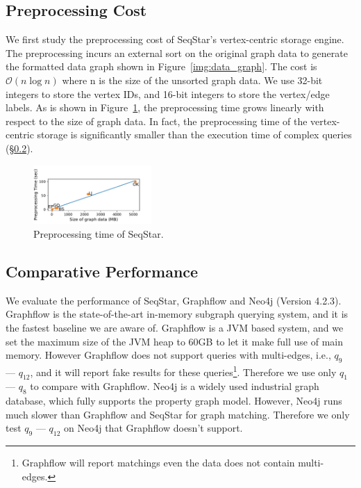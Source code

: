 \subsection{Preprocessing Cost}
We first study the preprocessing cost of SeqStar's vertex-centric storage engine.
The preprocessing incurs an external sort on the original graph data to generate the formatted data graph shown in Figure~\ref{img:data_graph}.
The cost is $\mathcal{O}(n \log n)$ where n is the size of the unsorted graph data.
We use 32-bit integers to store the vertex IDs, and 16-bit integers to store the vertex/edge labels.
As is shown in Figure~\ref{img:exp_preprocessing}, the preprocessing time grows linearly with respect to the size of graph data.
In fact, the preprocessing time of the vertex-centric storage is significantly smaller than the execution time of complex queries (\S\ref{sec:experiments_compare}).

\begin{figure}[ht]
  \centering
  \includegraphics[width=0.4\textwidth]{img/exp_preprocessing.pdf}
  \caption{Preprocessing time of SeqStar.}\label{img:exp_preprocessing}
\end{figure}
\subsection{Comparative Performance}\label{sec:experiments_compare}
We evaluate the performance of SeqStar, Graphflow and Neo4j (Version 4.2.3).
Graphflow is the state-of-the-art in-memory subgraph querying system,
and it is the fastest baseline we are aware of.
Graphflow is a JVM based system, and we set the maximum size of the JVM heap to 60GB to let it make full use of main memory.
However Graphflow does not support queries with multi-edges, i.e., $q_9$ --- $q_{12}$,
and it will report fake results for these queries\footnote{Graphflow will report matchings even the data does not contain multi-edges.}.
Therefore we use only $q_1$ --- $q_8$ to compare with Graphflow.
Neo4j is a widely used industrial graph database, which fully supports the property graph model.
However, Neo4j runs much slower than Graphflow and SeqStar for graph matching.
Therefore we only test $q_9$ --- $q_{12}$  on Neo4j that Graphflow doesn't support.


